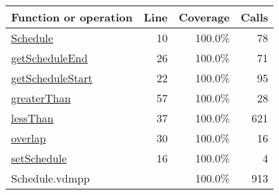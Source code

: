 \bigskip
\begin{longtable}{|l|r|r|r|}
\hline
Function or operation & Line & Coverage & Calls \\
\hline
\hline
\hyperref[Schedule:10]{Schedule} & 10&100.0\% & 78 \\
\hline
\hyperref[getScheduleEnd:26]{getScheduleEnd} & 26&100.0\% & 71 \\
\hline
\hyperref[getScheduleStart:22]{getScheduleStart} & 22&100.0\% & 95 \\
\hline
\hyperref[greaterThan:57]{greaterThan} & 57&100.0\% & 28 \\
\hline
\hyperref[lessThan:37]{lessThan} & 37&100.0\% & 621 \\
\hline
\hyperref[overlap:30]{overlap} & 30&100.0\% & 16 \\
\hline
\hyperref[setSchedule:16]{setSchedule} & 16&100.0\% & 4 \\
\hline
\hline
Schedule.vdmpp & & 100.0\% & 913 \\
\hline
\end{longtable}

